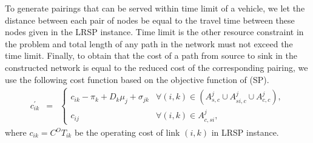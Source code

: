 To generate pairings that can be served within time limit of a vehicle, we let the distance 
between each pair of nodes be equal to the travel time between these nodes given in the 
LRSP instance. Time limit is the other resource constraint in the problem and total length
of any path in the network must not exceed the time limit. Finally, to obtain 
that the cost of a path from source to sink in the constructed network is equal to the 
reduced cost of the corresponding pairing, we use the following cost function based
on the objective function of (SP). 
\begin{eqnarray}
c^{'}_{ik} & = & \left \{  \begin{array}{ll}
                 c_{ik}-\pi_{k} + D_k \mu_j + \sigma_{jk} & \forall (i,k) \in  (A^{j}_{s,c} \cup A^{j}_{si,c} \cup A^{j}_{c,c}), \\
                 c_{ij} & \forall (i,k) \in A^{j}_{c,si},
                 \end{array}
              \right. \label{cost-espprc-ntw}
\end{eqnarray}
where $c_{ik} = C^O T_{ik}$ be the operating cost of link $(i,k)$ in LRSP instance.

